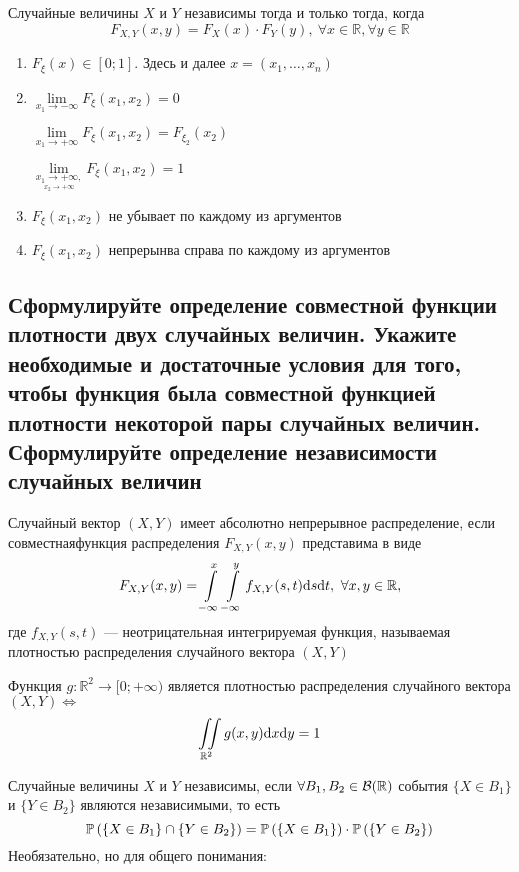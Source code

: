 \documentclass{article}
\begin{document}
\theorem Случайные величины $X$ и $Y$ независимы тогда и только тогда, когда
\begin{equation*}
    F_{X,Y}(x,y)=F_{X}(x)\cdot F_{Y}(y),\ \forall x\in\mathbb{R},\forall y\in\mathbb{R}
\end{equation*}

\theorem
\begin{enumerate}
    \item $F_{\xi}(x)\in[0;1]$. Здесь и далее $x=(x_1,\ldots,x_n)$
    \item $\lim\limits_{x_1\rightarrow-\infty}F_{\xi}(x_1,x_2)=0$
    
    $\lim\limits_{x_1\rightarrow+\infty}F_{\xi}(x_1,x_2)=F_{\xi_2}(x_2)$

    $\lim\limits_{\underset{x_2\rightarrow+\infty}{x_1\rightarrow+\infty,}}F_{\xi}(x_1,x_2)=1$
    \item $F_{\xi}(x_1,x_2)$ не убывает по каждому из аргументов
    \item $F_{\xi}(x_1,x_2)$ непрерынва справа по каждому из аргументов
\end{enumerate}

\subsection{Сформулируйте определение совместной функции плотности двух случайных величин. Укажите необходимые и достаточные условия для того, чтобы функция была совместной функцией плотности некоторой пары случайных величин. Сформулируйте определение независимости случайных величин}
 Случайный вектор $(X,Y)$ имеет абсолютно непрерывное распределение, если совместнаяфункция распределения $F_{X,Y}(x,y)$ представима в виде
\begin{equation*}
    F_{X,Y}(x,y)=\int\limits_{-\infty}^{x}\int\limits_{-\infty}^{y} f_{X,Y}(s,t)\text{d}s\text{d}t,\ \forall x,y\in\mathbb{R},
\end{equation*}
где $f_{X,Y}(s,t)$ — неотрицательная интегрируемая функция, называемая плотностью распределения случайного вектора $(X,Y)$

\theorem Функция $g:\mathbb{R}^2\to[0;+\infty)$ является плотностью распределения случайного вектора $(X,Y)\Longleftrightarrow$
\begin{equation*}
    \iint\limits_{\mathbb{R}^2}g(x,y)\text{d}x\text{d}y=1
\end{equation*} 

 Случайные величины $X$ и $Y$ независимы, если $\forall B_1,B_2\in\mathcal{B}(\mathbb{R})$ события $\{X\in B_1\}$ и $\{Y\in B_2\}$ являются независимыми, то есть
\begin{equation*}
    \mathbb{P}\left(\{X\in B_1\}\cap\{Y\in B_2\}\right)=\mathbb{P}\left(\{X\in B_1\}\right)\cdot\mathbb{P}\left(\{Y\in B_2\}\right)
\end{equation*}
Необязательно, но для общего понимания:
\end{document}
